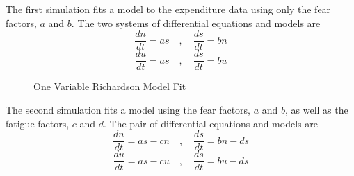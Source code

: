\documentclass[12pt, centerh1]{article}
\newcommand{\squeezeup}{\vspace{-13.0mm}}
\begin{document}
The first simulation fits a model to the expenditure data using only the fear factors, $a$ and $b$. The two systems of differential equations and models are
\begin{equation*}\label{NS}
    \frac{dn}{dt}= as \quad ,\quad  \frac{ds}{dt} = bn 
\end{equation*}
\begin{equation*}\label{NS}
    \frac{du}{dt}= as \quad ,\quad \frac{ds}{dt} = bu 
\end{equation*}
\squeezeup
\begin{figure}[htb!]
    \centering
    \hfill
    \caption{One Variable Richardson Model Fit}
\end{figure}
\newpage
The second simulation fits a model using the fear factors, $a$ and $b$, as well as the fatigue factors, $c$ and $d$. The pair of differential equations and models are 
\begin{equation*}\label{NS}
    \frac{dn}{dt}= as - cn \quad ,\quad  \frac{ds}{dt} = bn - ds
\end{equation*}
\begin{equation*}\label{NS}
    \frac{du}{dt}= as -cu \quad ,\quad \frac{ds}{dt} = bu - ds
\end{equation*}
\end{document}
